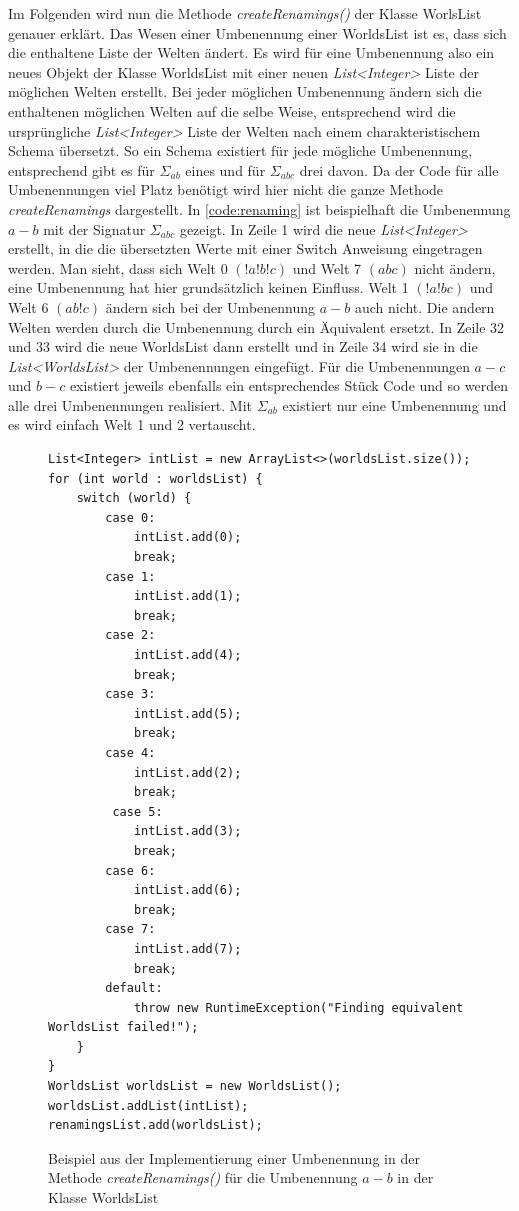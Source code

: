 \documentclass[12pt,a4paper]{article}
\begin{document}
Im Folgenden wird nun die Methode \textit{createRenamings()} der Klasse WorlsList genauer erklärt. Das Wesen einer Umbenennung einer WorldsList ist es, dass sich die enthaltene Liste der Welten ändert. Es wird für eine Umbenennung also ein neues Objekt der Klasse WorldsList mit einer neuen \textit{List<Integer>} Liste der möglichen Welten erstellt. Bei jeder möglichen Umbenennung ändern sich die enthaltenen möglichen Welten auf die selbe Weise, entsprechend wird die ursprüngliche \textit{List<Integer>} Liste der Welten nach einem charakteristischem Schema \glqq übersetzt\grqq. So ein Schema existiert für jede mögliche Umbenennung, entsprechend gibt es für $\Sigma_{ab}$ eines und für $\Sigma_{abc}$ drei davon. Da der Code für alle Umbenennungen viel Platz benötigt wird hier nicht die ganze Methode \textit{createRenamings} dargestellt. In \autoref{code:renaming} ist beispielhaft die Umbenennung $a-b$ mit der Signatur $\Sigma_{abc}$ gezeigt. In Zeile 1 wird die neue \textit{List<Integer>} erstellt, in die die übersetzten Werte mit einer Switch Anweisung eingetragen werden. Man sieht, dass sich  Welt 0 $(!a!b!c)$ und Welt 7 $(abc)$ nicht ändern, eine Umbenennung hat hier grundsätzlich keinen Einfluss. Welt 1 $(!a!bc)$ und Welt 6 $(ab!c)$ ändern sich bei der Umbenennung $a-b$ auch nicht. Die andern Welten werden durch die Umbenennung durch ein Äquivalent ersetzt. In Zeile 32 und 33 wird die neue WorldsList dann erstellt und in Zeile 34 wird sie in die \textit{List<WorldsList>} der Umbenennungen eingefügt.  Für die Umbenennungen $a-c$ und $b-c$ existiert jeweils ebenfalls ein entsprechendes Stück Code und so werden alle drei Umbenennungen realisiert. Mit $\Sigma_{ab}$ existiert nur eine Umbenennung und es wird einfach Welt 1 und 2 vertauscht.


\begin{figure}
\begin{lstlisting}
List<Integer> intList = new ArrayList<>(worldsList.size());
for (int world : worldsList) {
    switch (world) {
        case 0:
            intList.add(0);
            break;
        case 1:
            intList.add(1);
            break;
        case 2:
            intList.add(4);
            break;
        case 3:
            intList.add(5);
            break;
        case 4:
            intList.add(2);
            break;
         case 5:
            intList.add(3);
            break;
        case 6:
            intList.add(6);
            break;
        case 7:
            intList.add(7);
            break;
        default:
            throw new RuntimeException("Finding equivalent WorldsList failed!");
    }
}
WorldsList worldsList = new WorldsList();
worldsList.addList(intList);
renamingsList.add(worldsList);
\end{lstlisting}
\caption{Beispiel aus der Implementierung einer Umbenennung in der Methode \textit{createRenamings()} für die Umbenennung $a-b$ in der Klasse WorldsList}
\label{code:renaming}
\end{figure}
\end{document}
